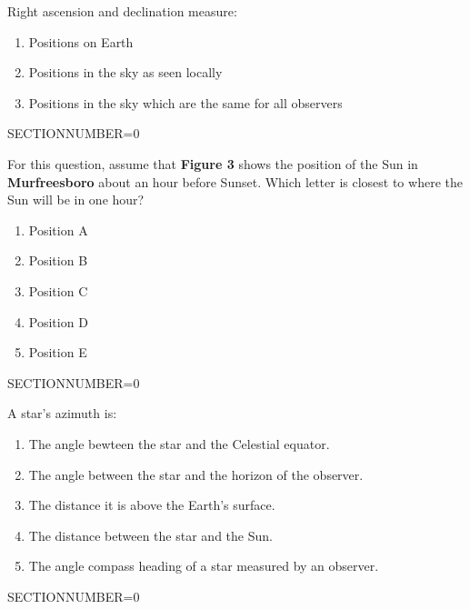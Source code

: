 \documentclass[11pt]{article}
\begin{document}
\begin{enumerate}
\begin{minipage}{\textwidth}
\begin{minipage}{\textwidth}
\item Right ascension and declination measure:
\begin{enumerate} 
\setlength{\itemsep}{1pt} 
\setlength{\parskip}{0pt} 
\setlength{\parsep}{0pt}
\setlength{\multicolsep}{1pt} 
\item Positions on Earth
\item Positions in the sky as seen locally
\item Positions in the sky which are the same for all observers
\end{enumerate} 
\end{minipage}
SECTIONNUMBER=0
\end{minipage}
\vskip 0.20in

\begin{minipage}{\textwidth}
\begin{minipage}{\textwidth}
\item For this question, assume that {\bf Figure 3} shows the position of the Sun in {\bf Murfreesboro} about an hour before Sunset.   Which letter is closest to where the Sun will be in one hour?
\begin{multicols}{3}
\begin{enumerate} 
\setlength{\itemsep}{1pt} 
\setlength{\parskip}{0pt} 
\setlength{\parsep}{0pt}
\setlength{\multicolsep}{1pt} 
\item Position A
\item Position B
\item Position C
\item Position D
\item Position E
\end{enumerate} 
\vfill 
\end{multicols}

\end{minipage}
SECTIONNUMBER=0
\end{minipage}
\vskip 0.20in

\begin{minipage}{\textwidth}
\begin{minipage}{\textwidth}
\item A star's azimuth is:
\begin{enumerate} 
\setlength{\itemsep}{1pt} 
\setlength{\parskip}{0pt} 
\setlength{\parsep}{0pt}
\setlength{\multicolsep}{1pt} 
\item The angle bewteen the star and the Celestial equator.
\item The angle between the star and the horizon of the observer.
\item The distance it is above the Earth's surface.
\item The distance between the star and the Sun.
\item The angle compass heading of a star measured by an observer.
\end{enumerate} 
\end{minipage}
SECTIONNUMBER=0
\end{minipage}
\vskip 0.20in


\end{enumerate}
\end{document}
